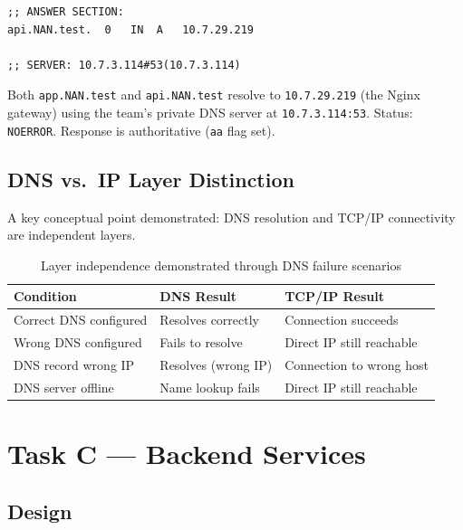\documentclass[12pt,a4paper]{article}
\begin{document}
\begin{lstlisting}[caption=dig output for api.NAN.test]
;; ANSWER SECTION:
api.NAN.test.  0   IN  A   10.7.29.219

;; SERVER: 10.7.3.114#53(10.7.3.114)
\end{lstlisting}

\begin{successbox}[Result]
Both \texttt{app.NAN.test} and \texttt{api.NAN.test} resolve to \texttt{10.7.29.219} (the Nginx gateway) using the team's private DNS server at \texttt{10.7.3.114:53}. Status: \texttt{NOERROR}. Response is authoritative (\texttt{aa} flag set).
\end{successbox}

\subsection{DNS vs.\ IP Layer Distinction}

A key conceptual point demonstrated: DNS resolution and TCP/IP connectivity are independent layers.

\begin{table}[h!]
\centering
\caption{Layer independence demonstrated through DNS failure scenarios}
\begin{tabular}{lll}
\toprule
\textbf{Condition} & \textbf{DNS Result} & \textbf{TCP/IP Result} \\
\midrule
Correct DNS configured & Resolves correctly & Connection succeeds \\
Wrong DNS configured & Fails to resolve & Direct IP still reachable \\
DNS record wrong IP & Resolves (wrong IP) & Connection to wrong host \\
DNS server offline & Name lookup fails & Direct IP still reachable \\
\bottomrule
\end{tabular}
\end{table}

\section{Task C --- Backend Services}

\subsection{Design}
\end{document}

